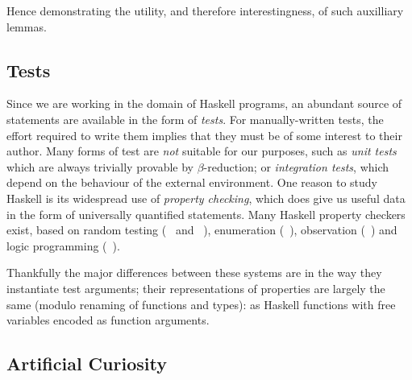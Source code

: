 Hence demonstrating the utility, and therefore interestingness, of such
auxilliary lemmas.


\subsection{Tests}

Since we are working in the domain of Haskell programs, an abundant source of
statements are available in the form of \emph{tests}. For manually-written
tests, the effort required to write them implies that they must be of some
interest to their author. Many forms of test are \emph{not} suitable for our
purposes, such as \emph{unit tests} which are always trivially provable by
$\beta$-reduction; or \emph{integration tests}, which depend on the behaviour of
the external environment. One reason to study Haskell is its widespread use of
\emph{property checking}, which does give us useful data in the form of
universally quantified statements. Many Haskell property checkers exist, based
on random testing (\quickcheck{}~\cite{claessen2011quickcheck} and
\smartcheck{}~\cite{pike2014smartcheck}), enumeration
(\smallcheck{}~\cite{runciman2008smallcheck}), observation
(\lazysmallcheck{}~\cite{reich2013advances}) and logic programming
(\sparsecheck{}~\cite{sparsecheck}).

Thankfully the major differences between these systems are in the way they
instantiate test arguments; their representations of properties are largely the
same (modulo renaming of functions and types): as Haskell functions with free
variables encoded as function arguments.

\subsection{Artificial Curiosity} \label{sec:intrinsic}

